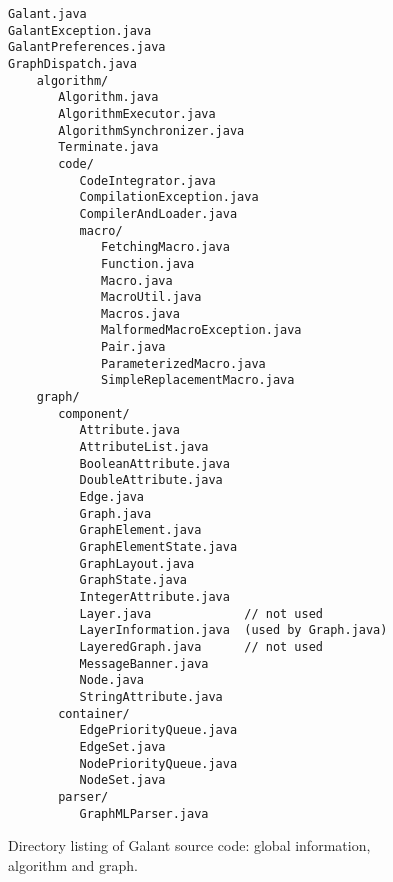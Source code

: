 \begin{figure}

  \begin{center}
      \begin{minipage}{4in}
  \small
\begin{verbatim}
Galant.java
GalantException.java
GalantPreferences.java
GraphDispatch.java
    algorithm/
       Algorithm.java
       AlgorithmExecutor.java
       AlgorithmSynchronizer.java
       Terminate.java
       code/
          CodeIntegrator.java
          CompilationException.java
          CompilerAndLoader.java
          macro/
             FetchingMacro.java
             Function.java
             Macro.java
             MacroUtil.java
             Macros.java
             MalformedMacroException.java
             Pair.java
             ParameterizedMacro.java
             SimpleReplacementMacro.java
    graph/
       component/
          Attribute.java
          AttributeList.java
          BooleanAttribute.java
          DoubleAttribute.java
          Edge.java
          Graph.java
          GraphElement.java
          GraphElementState.java
          GraphLayout.java
          GraphState.java
          IntegerAttribute.java
          Layer.java             // not used
          LayerInformation.java  (used by Graph.java)
          LayeredGraph.java      // not used
          MessageBanner.java
          Node.java
          StringAttribute.java
       container/
          EdgePriorityQueue.java
          EdgeSet.java
          NodePriorityQueue.java
          NodeSet.java
       parser/
          GraphMLParser.java
\end{verbatim}
      \end{minipage}
  \end{center}

  \medskip
  \caption{Directory listing of Galant source code: global information,
    algorithm and graph.}
  \label{fig:directory_listing_1}
\end{figure}


